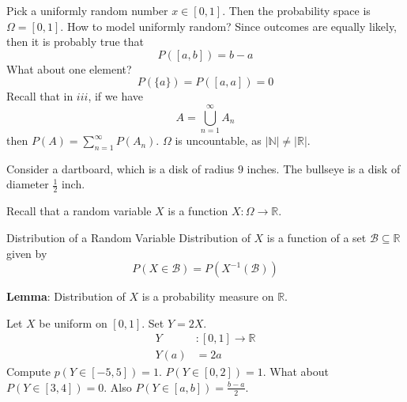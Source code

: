 \documentclass{report}
\begin{document}
\begin{examples}
    \begin{example}
            Pick a uniformly random number $x \in [0, 1]$. Then the probability space is $\Omega = [0, 1]$. How to model uniformly random? Since outcomes are equally likely, then it is probably true that 
            \begin{equation*}
                P([a, b]) = b - a
            \end{equation*}
        What about one element? 
            \begin{equation*}
                P(\{a\}) = P([a, a]) = 0
            \end{equation*}
        Recall that in $iii$, if we have
            \begin{equation*}
                A = \bigcup_{n = 1}^{\infty}A_{n}
            \end{equation*}
        then $P(A) = \sum_{n =1}^{\infty}P(A_{n})$. $\Omega$ is uncountable, as $\lvert \mathbb{N} \rvert \neq \lvert \mathbb{R} \rvert$. 
    \end{example}
    \begin{example}
        Consider a dartboard, which is a disk of radius $9$ inches. The bullseye is a  disk of diameter $\frac{1}{2}$ inch. 
    \end{example}
\end{examples} 

Recall that a random variable $X$ is a function $X : \Omega \rightarrow \mathbb{R}$.

\begin{definition}{Distribution of a Random Variable}
    Distribution of $X$ is a function of a set $\mathcal{B} \subseteq \mathbb{R}$ given by 
        \begin{equation*}
            P(X \in \mathcal{B}) = P(X^{-1}(\mathcal{B}))
        \end{equation*}
\end{definition}

\textbf{Lemma}: Distribution of $X$ is a probability measure on $\mathbb{R}$.

\begin{examples}
    \begin{example}
        Let $X$ be uniform on $[0, 1]$. Set $Y = 2X$. 
            \begin{align*}
                Y    &: [0, 1] \rightarrow \mathbb{R} \\
                Y(a) &= 2a                              
            \end{align*}
        Compute $p(Y \in [-5, 5]) = 1$. $P(Y \in [0, 2]) = 1$. What about $P(Y \in [3, 4]) = 0$. Also $P(Y \in [a, b]) = \frac{b - a}{2}$.
    \end{example}
\end{examples}
\end{document}
